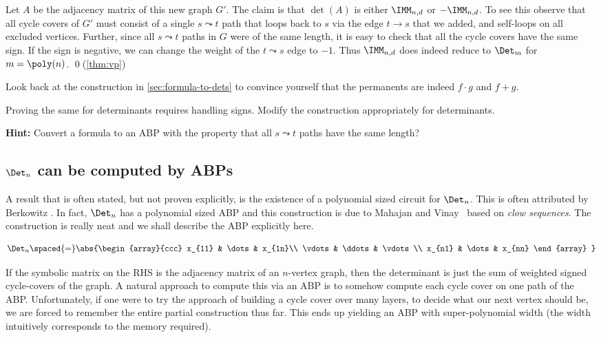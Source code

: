 Let $A$ be the adjacency matrix of this new graph $G'$. 
The claim is that $\det(A)$ is either $\IMM_{n,d}$ or $-\IMM_{n,d}$. 
To see this observe that all cycle covers of $G'$ must consist of a single $s\leadsto t$ path that loops back to $s$ via the edge $t\rightarrow s$ that we added, and self-loops on all excluded vertices. 
Further, since all $s\leadsto t$ paths in $G$ were of the same length, it is easy to check that all the cycle covers
have the same sign. If the sign is negative, we can change the weight of the $t\leadsto s$ edge to $-1$.
Thus $\IMM_{n,d}$ does indeed reduce to $\Det_m$ for $m = \poly(n)$. \qed {\footnotesize (\autoref{thm:vp})}\\

\begin{exercise}
Look back at the construction in \autoref{sec:formula-to-dets} to convince yourself that the permanents are indeed $f \cdot g$ and $f + g$. 

Proving the same for determinants requires handling signs. Modify the construction appropriately for determinants. 

{\bf Hint:} Convert a formula to an ABP with the property that all $s \leadsto t$ paths have the same length?
\end{exercise}


\subsection{$\Det_n$ can be computed by ABPs}

A result that is often stated, but not proven explicitly, is the existence of a polynomial sized circuit for $\Det_n$. 
This is often attributed by Berkowitz \cite{Berk84}. 
In fact, $\Det_n$ has a polynomial sized ABP and this construction is due to Mahajan and Vinay~\cite{mv97} based on \emph{clow sequences}. 
The construction is really neat and we shall describe the ABP explicitly here. 

\[
\Det_n \spaced{=} \abs{\begin{array}{ccc}
x_{11} & \dots & x_{1n}\\
\vdots & \ddots & \vdots \\
x_{n1} & \dots & x_{nn}
\end{array}
}\]

If the symbolic matrix on the RHS is the adjacency matrix of an $n$-vertex graph, then the determinant is just the sum of weighted signed cycle-covers of the graph. 
A natural approach to compute this via an ABP is to somehow compute each cycle cover on one path of the ABP. 
Unfortunately, if one were to try the \naive approach of building a cycle cover over many layers, to decide what our next vertex should be, we are forced to remember the entire partial construction thus far. 
This ends up yielding an ABP with super-polynomial width (the width intuitively corresponds to the memory required). 

